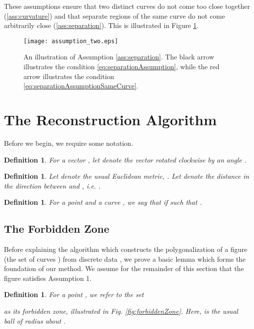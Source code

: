 \documentclass{article}
\newtheorem{definition}[cntr]{Definition}
\numberwithin{cntr}{section}
\numberwithin{equation}{section}
\begin{document}
These assumptions ensure that two distinct curves do not come too close
together (\ref{ass:curvature})  and that separate regions of
the same curve do not come
arbitrarily close (\ref{ass:separation}).
This is illustrated in Figure \ref{fig:separationBetweenCurves}.

\begin{figure}
\setlength{\unitlength}{0.240900pt}
\ifx\plotpoint\undefined\newsavebox{\plotpoint}\fi
\sbox{\plotpoint}{\rule[-0.200pt]{0.400pt}{0.400pt}}\texttt{[image: assumption\_two.eps]}

\caption{An illustration of Assumption \ref{ass:separation}. The black arrow illustrates the condition \eqref{eq:separationAssumption}, while the red arrow illustrates the condition \eqref{eq:separationAssumptionSameCurve}.}
\label{fig:separationBetweenCurves}
\end{figure}

\section{The Reconstruction Algorithm}

Before we begin, we require some notation.

\begin{definition}
  \label{def:perp}
  For a vector , let  denote the vector 
rotated clockwise by an angle .
\end{definition}

\begin{definition}
  \label{def:metric}
  Let  denote the usual Euclidean metric, . Let  denote the distance in the  direction between  and , i.e. .
\end{definition}

\begin{definition}
  For a point  and a curve , we say that  if  such that .
\end{definition}

\subsection{The Forbidden Zone}

Before explaining the algorithm which constructs the polygonalization of
a figure (the set of curves ) from discrete data , we
prove a basic lemma which forms the foundation of our method.
We assume for the remainder of this section that the figure
satisfies Assumption 1.

\begin{definition}
  For a point , we refer to the set

as its \emph{forbidden zone},
illustrated in Fig. \ref{fig:forbiddenZone}.
Here,  is the usual ball of radius  about .
\end{definition}
\end{document}
